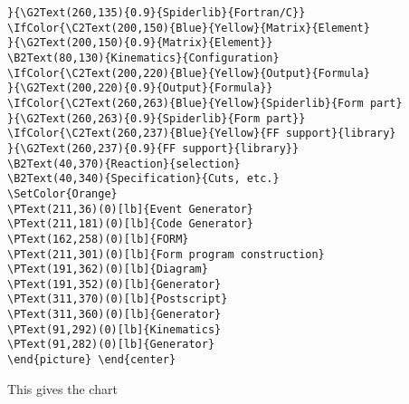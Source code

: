 \documentclass[11pt,a4paper]{article}
\begin{document}
\begin{verbatim}
}{\G2Text(260,135){0.9}{Spiderlib}{Fortran/C}}
\IfColor{\C2Text(200,150){Blue}{Yellow}{Matrix}{Element}
}{\G2Text(200,150){0.9}{Matrix}{Element}}
\B2Text(80,130){Kinematics}{Configuration}
\IfColor{\C2Text(200,220){Blue}{Yellow}{Output}{Formula}
}{\G2Text(200,220){0.9}{Output}{Formula}}
\IfColor{\C2Text(260,263){Blue}{Yellow}{Spiderlib}{Form part}
}{\G2Text(260,263){0.9}{Spiderlib}{Form part}}
\IfColor{\C2Text(260,237){Blue}{Yellow}{FF support}{library}
}{\G2Text(260,237){0.9}{FF support}{library}}
\B2Text(40,370){Reaction}{selection}
\B2Text(40,340){Specification}{Cuts, etc.}
\SetColor{Orange}
\PText(211,36)(0)[lb]{Event Generator}
\PText(211,181)(0)[lb]{Code Generator}
\PText(162,258)(0)[lb]{FORM}
\PText(211,301)(0)[lb]{Form program construction}
\PText(191,362)(0)[lb]{Diagram}
\PText(191,352)(0)[lb]{Generator}
\PText(311,370)(0)[lb]{Postscript}
\PText(311,360)(0)[lb]{Generator}
\PText(91,292)(0)[lb]{Kinematics}
\PText(91,282)(0)[lb]{Generator}
\end{picture} \end{center}
\end{verbatim}
\IfColor{\textBlack}{}
This gives the chart
\end{document}
